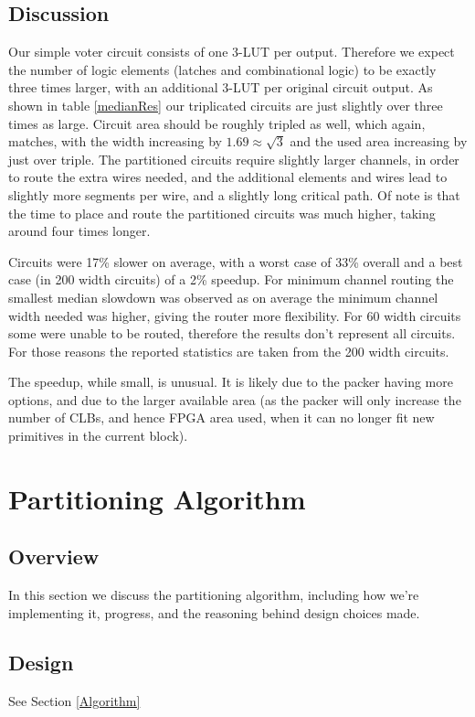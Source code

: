 \documentclass[12pt,drafta4paper,oneside]{memoir} %
\begin{document}
\section{Discussion}
Our simple voter circuit consists of one 3-\ac{LUT} per output. Therefore we expect the number of logic elements (latches and combinational logic) to be exactly three times larger, with an additional 3-\ac{LUT} per original circuit output. As shown in table \ref{medianRes} our triplicated circuits are just slightly over three times as large. Circuit area should be roughly tripled as well, which again, matches, with the width increasing by $1.69 \approx \sqrt{3}$ and the used area increasing by just over triple. The partitioned circuits require slightly larger channels, in order to route the extra wires needed, and the additional elements and wires lead to slightly more segments per wire, and a slightly long critical path. Of note is that the time to place and route the partitioned circuits was much higher, taking around four times longer.

Circuits were 17\% slower on average, with a worst case of 33\% overall and a best case (in 200 width circuits) of a 2\% speedup. For minimum channel routing the smallest median slowdown was observed as on average the minimum channel width needed was higher, giving the router more flexibility. For 60 width circuits some were unable to be routed, therefore the results don't represent all circuits. For those reasons the reported statistics are taken from the 200 width circuits.

The speedup, while small, is unusual. It is likely due to the packer having more options, and due to the larger available area (as the packer will only increase the number of \acp{CLB}, and hence \ac{FPGA} area used, when it can no longer fit new primitives in the current block).


\chapter{Partitioning Algorithm}
\section{Overview}
In this section we discuss the partitioning algorithm, including how we're implementing it, progress, and the reasoning behind design choices made.
\section{Design}
See Section \ref{Algorithm}
\end{document}

